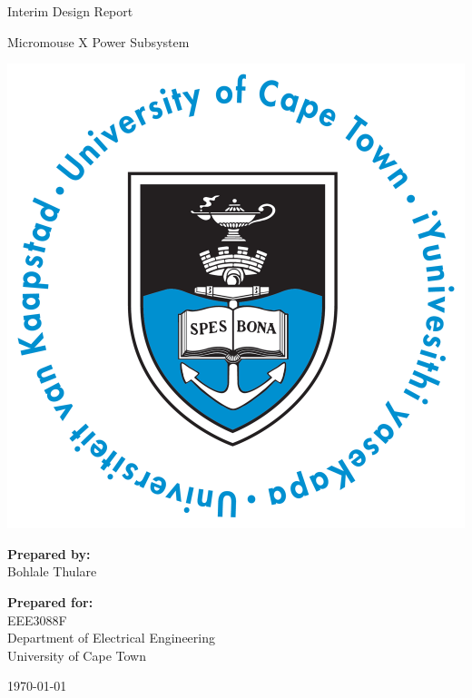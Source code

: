 \thispagestyle{empty}
\begin{center}
    
\Huge

\vspace{5cm}

Interim Design Report

\vspace{0.1cm}
\large
Micromouse X Power Subsystem

\vspace{2cm}
\includegraphics[width=0.6\linewidth]{FrontMatter/UCT_logo.png}

\vfill

\large
\textbf{Prepared by:}\\
Bohlale Thulare

\vspace{1cm}

\textbf{Prepared for:}\\
EEE3088F\\
Department of Electrical Engineering\\
University of Cape Town

\vspace{2cm}

\today


\end{center}